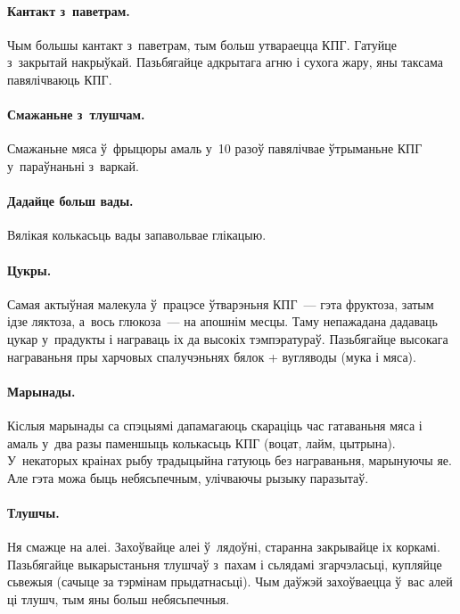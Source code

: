 \paragraph{Кантакт з~паветрам.}
Чым большы кантакт з~паветрам, тым больш утвараецца КПГ. Гатуйце з~закрытай накрыўкай. Пазьбягайце адкрытага агню і сухога жару, яны таксама павялічваюць КПГ.

\paragraph{Смажаньне з~тлушчам.}
Смажаньне мяса ў~фрыцюры амаль у~10 разоў павялічвае ўтрыманьне КПГ у~параўнаньні з~варкай.

\paragraph{Дадайце больш вады.}
Вялікая колькасьць вады запавольвае глікацыю.

\paragraph{Цукры.}
Самая актыўная малекула ў~працэсе ўтварэньня КПГ~--- гэта фруктоза, затым ідзе ляктоза, а~вось глюкоза~--- на апошнім месцы. Таму непажадана дадаваць цукар у~прадукты і награваць іх да высокіх тэмпэратураў. Пазьбягайце высокага награваньня пры харчовых спалучэньнях бялок + вугляводы (мука і мяса).


\paragraph{Марынады.}
Кіслыя марынады са спэцыямі дапамагаюць скараціць час гатаваньня мяса і амаль у~два разы паменшыць колькасьць КПГ (воцат, лайм, цытрына). У~некаторых краінах рыбу традыцыйна гатуюць без награваньня, марынуючы яе. Але гэта можа быць небясьпечным, улічваючы рызыку паразытаў.

\paragraph{Тлушчы.}
Ня смажце на алеі. Захоўвайце алеі ў~лядоўні, старанна закрывайце іх коркамі. Пазьбягайце выкарыстаньня тлушчаў з~пахам і сьлядамі згарчэласьці, купляйце сьвежыя (сачыце за тэрмінам прыдатнасьці). Чым даўжэй захоўваецца ў~вас алей ці тлушч, тым яны больш небясьпечныя.

